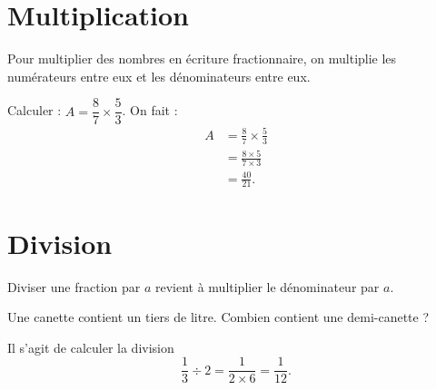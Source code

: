 \section{Multiplication}



\begin{Aretenir}
Pour multiplier des nombres en écriture fractionnaire, on multiplie les numérateurs entre eux et les dénominateurs entre eux.
\end{Aretenir}

\begin{example}
    Calculer : \( A=\dfrac{ 8 }{ 7 }\times \dfrac{ 5 }{ 3 }\). On fait :
    \begin{subequations}
        \begin{align}
            A&=\frac{ 8 }{ 7 }\times \frac{ 5 }{ 3 }\\
            &=\frac{ 8\times 5 }{ 7\times 3 }\\
            &=\frac{ 40 }{ 21 }.
        \end{align}
    \end{subequations}
\end{example}

\section{Division}



\begin{Aretenir}
   Diviser une fraction par \( a\) revient à multiplier le dénominateur par \( a\).
\end{Aretenir}


\begin{example}
    Une canette contient un tiers de litre. Combien contient une demi-canette ?

    Il s'agit de calculer la division
    \begin{equation}
        \dfrac{ 1 }{ 3 }\div 2=\frac{ 1 }{ 2\times 6 }=\frac{ 1 }{ 12 }.
    \end{equation}
\end{example}

